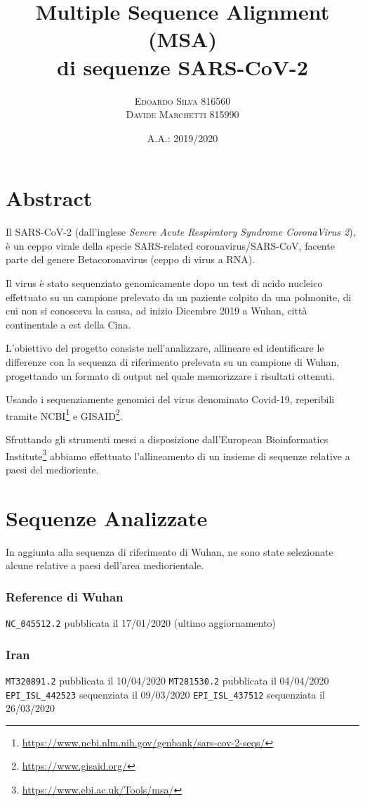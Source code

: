 \documentclass[11pt,italian]{article}
\title{Multiple Sequence Alignment (MSA) \\ di sequenze SARS-CoV-2}
\date{A.A.: 2019/2020}
\author{
    \textsc{Edoardo Silva} 816560 \\
    \textsc{Davide Marchetti} 815990
}
\makeatletter
\newcommand*{\lstitem}[1][]{%
  \setbox0\hbox\bgroup
    \patchcmd{\lst@InlineM}{\@empty}{\@empty\egroup\item[\usebox0]\leavevmode\ignorespaces}{}{}%
    \lstinline[#1]%
}
\makeatother
\begin{document}
\maketitle

\section*{Abstract}
Il SARS-CoV-2 (dall'inglese \textit{Severe Acute Respiratory Syndrome CoronaVirus 2}), è un ceppo virale della specie SARS-related coronavirus/SARS-CoV, facente parte del genere Betacoronavirus (ceppo di virus a RNA).

Il virus è stato sequenziato genomicamente dopo un test di acido nucleico effettuato su un campione prelevato da un paziente colpito da una polmonite, di cui non si conosceva la causa, ad inizio Dicembre 2019 a Wuhan, città continentale a est della Cina.

L'obiettivo del progetto consiste nell'analizzare, allineare ed identificare le differenze con la sequenza di riferimento prelevata su un campione di Wuhan, progettando un formato di output nel quale memorizzare i risultati ottenuti.

Usando i sequenziamente genomici del virus denominato Covid-19, reperibili tramite NCBI\footnote{\url{https://www.ncbi.nlm.nih.gov/genbank/sars-cov-2-seqs/}} e GISAID\footnote{\url{https://www.gisaid.org/}}.

Sfruttando gli strumenti messi a disposizione dall'European Bioinformatics Institute\footnote{\url{https://www.ebi.ac.uk/Tools/msa/}} abbiamo effettuato l'allineamento di un insieme di sequenze relative a paesi del medioriente.

\newpage
\section{Sequenze Analizzate}
In aggiunta alla sequenza di riferimento di Wuhan, ne sono state selezionate alcune relative a paesi dell'area mediorientale.

\subsubsection*{Reference di Wuhan}
\begin{description}
    \lstitem{NC_045512.2} pubblicata il 17/01/2020 (ultimo aggiornamento)
\end{description}

\subsubsection*{Iran}
\begin{description}
    \lstitem{MT320891.2} pubblicata il 10/04/2020
    \lstitem{MT281530.2} pubblicata il 04/04/2020
    \lstitem{EPI_ISL_442523} sequenziata il 09/03/2020
    \lstitem{EPI_ISL_437512} sequenziata il 26/03/2020
\end{description}
\end{document}
